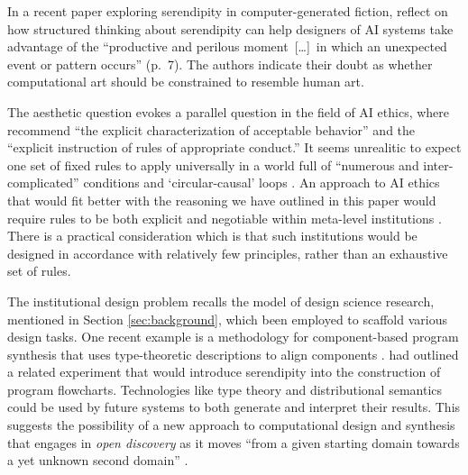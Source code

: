 In a recent paper exploring serendipity in computer-generated fiction,
\citet{mccallum2018} reflect on how structured thinking about
serendipity can help designers of AI systems take advantage of the
``productive and perilous moment~[\ldots]~in which an unexpected event
or pattern occurs'' (p.~7).  The authors indicate their doubt as
whether computational art should be constrained to resemble human art.

The aesthetic question evokes a parallel question in the field of AI
ethics, where \citet{caliskan2017semantics} recommend ``the explicit
characterization of acceptable behavior'' and the ``explicit
instruction of rules of appropriate conduct.''  It seems unrealitic to
expect one set of fixed rules to apply universally in a world full of
``numerous and inter-complicated'' conditions \cite[p.~710]{lovelace}
and `circular-causal' loops \cite{loughran2018serendipity}.  An
approach to AI ethics that would fit better with the reasoning we have
outlined in this paper would require rules to be both explicit and
negotiable within meta-level institutions
\cite{corneli2016institutional}.  There is a practical consideration
which is that such institutions would be designed in accordance with
relatively few principles, rather than an exhaustive set of rules.

The institutional design problem recalls the model of design science
research, mentioned in Section \ref{sec:background}, which been
employed to scaffold various design tasks.  One recent example is a
methodology for component-based program synthesis that uses
type-theoretic descriptions to align components
\cite{10.1007/978-3-030-03427-6_35}.  \citet{pease2013discussion} had
outlined a related experiment that would introduce serendipity into
the construction of program flowcharts.  Technologies like type theory
and distributional semantics \cite{DBLP:journals/corr/abs-1803-09473}
could be used by future systems to both generate and interpret their
results.  This suggests the possibility of a new approach to
computational design and synthesis that engages in \emph{open
  discovery} as it moves ``from a given starting domain towards a yet
unknown second domain'' \cite{jurvsivc2012cross}.


